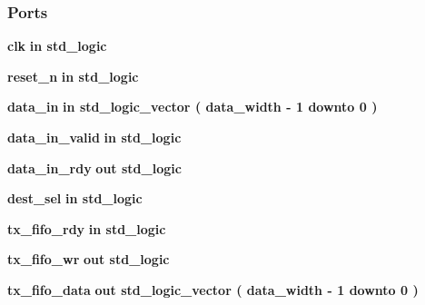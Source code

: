 \subsubsection*{Ports}
 \begin{DoxyCompactItemize}
\item 
{\bf clk}  {\bfseries {\bfseries \textcolor{keywordflow}{in}\textcolor{vhdlchar}{ }}} {\bfseries \textcolor{comment}{std\+\_\+logic}\textcolor{vhdlchar}{ }} 
\item 
{\bf reset\+\_\+n}  {\bfseries {\bfseries \textcolor{keywordflow}{in}\textcolor{vhdlchar}{ }}} {\bfseries \textcolor{comment}{std\+\_\+logic}\textcolor{vhdlchar}{ }} 
\item 
{\bf data\+\_\+in}  {\bfseries {\bfseries \textcolor{keywordflow}{in}\textcolor{vhdlchar}{ }}} {\bfseries \textcolor{comment}{std\+\_\+logic\+\_\+vector}\textcolor{vhdlchar}{ }\textcolor{vhdlchar}{(}\textcolor{vhdlchar}{ }\textcolor{vhdlchar}{ }\textcolor{vhdlchar}{ }\textcolor{vhdlchar}{ }{\bfseries {\bf data\+\_\+width}} \textcolor{vhdlchar}{-\/}\textcolor{vhdlchar}{ } \textcolor{vhdldigit}{1} \textcolor{vhdlchar}{ }\textcolor{keywordflow}{downto}\textcolor{vhdlchar}{ }\textcolor{vhdlchar}{ } \textcolor{vhdldigit}{0} \textcolor{vhdlchar}{ }\textcolor{vhdlchar}{)}\textcolor{vhdlchar}{ }} 
\item 
{\bf data\+\_\+in\+\_\+valid}  {\bfseries {\bfseries \textcolor{keywordflow}{in}\textcolor{vhdlchar}{ }}} {\bfseries \textcolor{comment}{std\+\_\+logic}\textcolor{vhdlchar}{ }} 
\item 
{\bf data\+\_\+in\+\_\+rdy}  {\bfseries {\bfseries \textcolor{keywordflow}{out}\textcolor{vhdlchar}{ }}} {\bfseries \textcolor{comment}{std\+\_\+logic}\textcolor{vhdlchar}{ }} 
\item 
{\bf dest\+\_\+sel}  {\bfseries {\bfseries \textcolor{keywordflow}{in}\textcolor{vhdlchar}{ }}} {\bfseries \textcolor{comment}{std\+\_\+logic}\textcolor{vhdlchar}{ }} 
\item 
{\bf tx\+\_\+fifo\+\_\+rdy}  {\bfseries {\bfseries \textcolor{keywordflow}{in}\textcolor{vhdlchar}{ }}} {\bfseries \textcolor{comment}{std\+\_\+logic}\textcolor{vhdlchar}{ }} 
\item 
{\bf tx\+\_\+fifo\+\_\+wr}  {\bfseries {\bfseries \textcolor{keywordflow}{out}\textcolor{vhdlchar}{ }}} {\bfseries \textcolor{comment}{std\+\_\+logic}\textcolor{vhdlchar}{ }} 
\item 
{\bf tx\+\_\+fifo\+\_\+data}  {\bfseries {\bfseries \textcolor{keywordflow}{out}\textcolor{vhdlchar}{ }}} {\bfseries \textcolor{comment}{std\+\_\+logic\+\_\+vector}\textcolor{vhdlchar}{ }\textcolor{vhdlchar}{(}\textcolor{vhdlchar}{ }\textcolor{vhdlchar}{ }\textcolor{vhdlchar}{ }\textcolor{vhdlchar}{ }{\bfseries {\bf data\+\_\+width}} \textcolor{vhdlchar}{-\/}\textcolor{vhdlchar}{ } \textcolor{vhdldigit}{1} \textcolor{vhdlchar}{ }\textcolor{keywordflow}{downto}\textcolor{vhdlchar}{ }\textcolor{vhdlchar}{ } \textcolor{vhdldigit}{0} \textcolor{vhdlchar}{ }\textcolor{vhdlchar}{)}\textcolor{vhdlchar}{ }} 

\end{DoxyCompactItemize}
